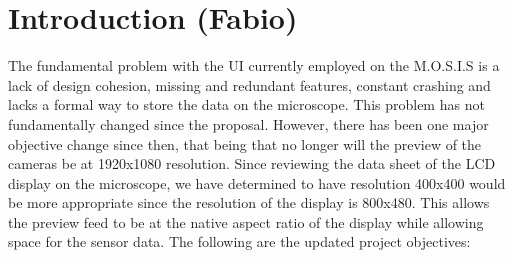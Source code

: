 \section{Introduction (Fabio)}
The fundamental problem with the UI currently employed on the M.O.S.I.S is a lack of design cohesion, missing and redundant features, constant crashing and lacks a formal way to store the data on the microscope. This problem has not fundamentally changed since the proposal. However, there has been one major objective change since then, that being that no longer will the preview of the cameras be at 1920x1080 resolution. Since reviewing the data sheet of the LCD display on the microscope, we have determined to have resolution 400x400 would be more appropriate since the resolution of the display is 800x480.\cite{5inchResistiveTouch} This allows the preview feed to be at the native aspect ratio of the display while allowing space for the sensor data. The following are the updated project objectives:
